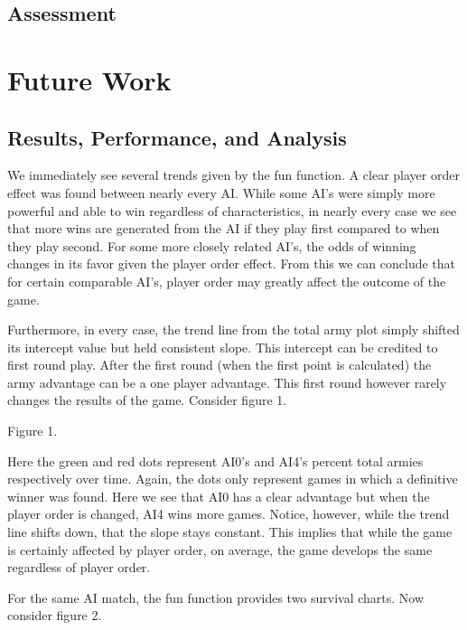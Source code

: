 \documentclass[12pt]{article}  %
\begin{document}
\subsection{Assessment}


\section{Future Work}






\subsection{Results, Performance, and Analysis }
We immediately see several trends given by the fun function. A clear player order effect was found between nearly every AI. While some AI’s were simply more powerful and able to win regardless of characteristics, in nearly every case we see that more wins are generated from the AI if they play first compared to when they play second. For some more closely related AI’s, the odds of winning changes in its favor given the player order effect. From this we can conclude that for certain comparable AI’s, player order may greatly affect the outcome of the game. 

Furthermore, in every case, the trend line from the total army plot simply shifted its intercept value but held consistent slope. This intercept can be credited to first round play. After the first round (when the first point is calculated) the army advantage can be a one player advantage. This first round however rarely changes the results of the game. Consider figure 1. 

\begin{center}
{\footnotesize Figure 1.}
\end{center}

Here the green and red dots represent AI0’s and AI4’s percent total armies respectively over time. Again, the dots only represent games in which a definitive winner was found. Here we see that AI0 has a clear advantage but when the player order is changed, AI4 wins more games. Notice, however, while the trend line shifts down, that the slope stays constant. This implies that while the game is certainly affected by player order, on average, the game develops the same regardless of player order. 

For the same AI match, the fun function provides two survival charts. Now consider figure 2. 
\end{document}
